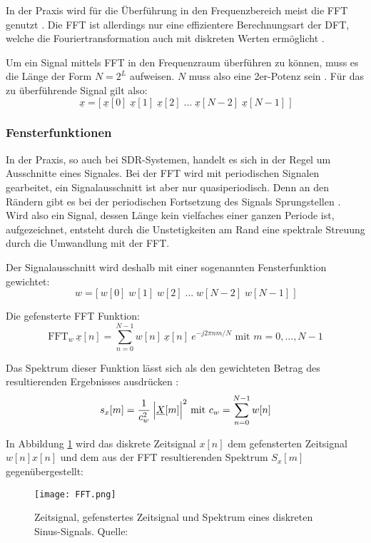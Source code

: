 In der Praxis wird für die Überführung in den Frequenzbereich meist die \ac{FFT} genutzt \cite[vgl. Heuberger, e. a., S. 14]{Heuberger:2017}. Die \ac{FFT} ist allerdings nur eine effizientere Berechnungsart der \ac{DFT}, welche die Fouriertransformation auch mit diskreten Werten ermöglicht \cite[vgl. Meyer, S. 175]{Meyer:2017}.

Um ein Signal mittels \ac{FFT} in den Frequenzraum überführen zu können, muss es die Länge der Form \(N = 2^L\) aufweisen. \(N\) muss also eine 2er-Potenz sein \cite[vgl. Heuberger, e. a., S. 15]{Heuberger:2017}.
Für das zu überführende Signal gilt also:
\[\underline{x} = \Big[ \:  \underline{x}[0] \; \underline{x}[1] \; \underline{x}[2] \; ... \; \underline{x}[N - 2] \; \underline{x}[N - 1] \; \Big] \]







\subsubsection{Fensterfunktionen}
In der Praxis, so auch bei \ac{SDR}-Systemen, handelt es sich in der Regel um Ausschnitte eines Signales. Bei der \ac{FFT} wird mit periodischen Signalen gearbeitet, ein Signalausschnitt ist aber nur quasiperiodisch. Denn an den Rändern gibt es bei der periodischen Fortsetzung des Signals Sprungstellen \cite[vgl. Meyer, S. 187]{Meyer:2017}.\newline
Wird also ein Signal, dessen Länge kein vielfaches einer ganzen Periode ist, aufgezeichnet, entsteht durch die Unstetigkeiten am Rand eine spektrale Streuung durch die Umwandlung mit der \ac{FFT}.

Der Signalausschnitt wird deshalb mit einer sogenannten Fensterfunktion gewichtet: 
\[w = \Big[ \:  w[0] \; w[1] \; w[2] \; ... \; w[N - 2] \; w[N - 1] \; \Big] \]


Die gefensterte FFT Funktion:
\[\text{FFT} _w \: {\underline{x}[n]} = \sum_{n=0}^{N-1} w[n] \: \underline{x}[n] \: e^{-j2\pi nm / N} \text{ mit } m = 0, ..., N-1\]


Das Spektrum dieser Funktion lässt sich als den gewichteten Betrag des resultierenden Ergebnisses ausdrücken \cite[vgl. Heuberger, e. a., S. 14]{Heuberger:2017}:
\[s_x[m] = \frac{1}{c_w^2} \: \Big{|}\underline{X}[m]  \Big{|}^2 \text{ mit } c_w = \sum_{n=0}^{N-1} w[n] \]

In Abbildung \ref{fft} wird das diskrete Zeitsignal \(x[n]\) dem gefensterten Zeitsignal \(w[n]x[n]\) und dem aus der FFT resultierenden Spektrum \(S_x[m]\) gegenübergestellt:
\begin{figure}[ht]
	\centering
	\texttt{[image: FFT.png]}
	\caption[Zeitsignal, gefenstertes Zeitsignal und Spektrum eines diskreten Sinus-Signals]{Zeitsignal, gefenstertes Zeitsignal und Spektrum eines diskreten Sinus-Signals. Quelle: \cite[Heuberger, e. a., S. 16]{Heuberger:2017}} 
	\label{fft}
\end{figure}




